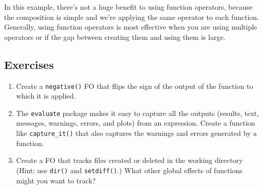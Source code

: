 \begin{Shaded}
\begin{Highlighting}[]
\StringTok{ }\NormalTok{(}
   
   \StringTok{ }
\NormalTok{)}
\StringTok{ }\NormalTok{(}\NormalTok{)}


\StringTok{ }
\CommentTok{#> }
\end{Highlighting}
\end{Shaded}

In this example, there's not a huge benefit to using function operators,
because the composition is simple and we're applying the same operator
to each function. Generally, using function operators is most effective
when you are using multiple operators or if the gap between creating
them and using them is large.

\subsection{Exercises}

\begin{enumerate}
\def\labelenumi{\arabic{enumi}.}
\item
  Create a \texttt{negative()} FO that flips the sign of the output of
  the function to which it is applied.
\item
  The \texttt{evaluate} package makes it easy to capture all the outputs
  (results, text, messages, warnings, errors, and plots) from an
  expression. Create a function like \texttt{capture\_it()} that also
  captures the warnings and errors generated by a function.
\item
  Create a FO that tracks files created or deleted in the working
  directory (Hint: use \texttt{dir()} and \texttt{setdiff()}.) What
  other global effects of functions might you want to track?
\end{enumerate}

